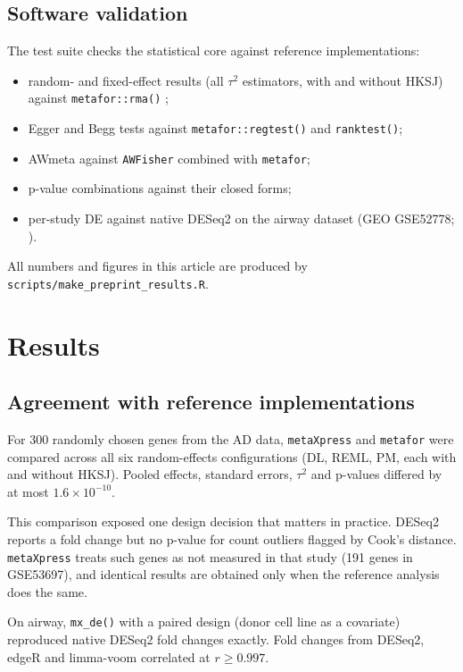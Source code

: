 \documentclass[11pt,a4paper]{article}
\begin{document}
\subsection{Software validation}
The test suite checks the statistical core against reference implementations:
\begin{itemize}[noitemsep,topsep=2pt]
    \item random- and fixed-effect results (all $\tau^2$ estimators, with and without HKSJ) against \texttt{metafor::rma()} \cite{viechtbauer2010metafor};
    \item Egger and Begg tests against \texttt{metafor::regtest()} and \texttt{ranktest()};
    \item AWmeta against \texttt{AWFisher} combined with \texttt{metafor};
    \item p-value combinations against their closed forms;
    \item per-study DE against native DESeq2 on the airway dataset (GEO GSE52778; \cite{himes2014airway}).
\end{itemize}
All numbers and figures in this article are produced by \nolinkurl{scripts/make_preprint_results.R}.

\section{Results}

\subsection{Agreement with reference implementations}
For 300 randomly chosen genes from the AD data, \texttt{metaXpress} and \texttt{metafor} were compared across all six random-effects configurations (DL, REML, PM, each with and without HKSJ). Pooled effects, standard errors, $\tau^2$ and p-values differed by at most $1.6\times10^{-10}$.

This comparison exposed one design decision that matters in practice. DESeq2 reports a fold change but no p-value for count outliers flagged by Cook's distance. \texttt{metaXpress} treats such genes as not measured in that study (191 genes in GSE53697), and identical results are obtained only when the reference analysis does the same.

On airway, \texttt{mx\_de()} with a paired design (donor cell line as a covariate) reproduced native DESeq2 fold changes exactly. Fold changes from DESeq2, edgeR and limma-voom correlated at $r \ge 0.997$.
\end{document}
